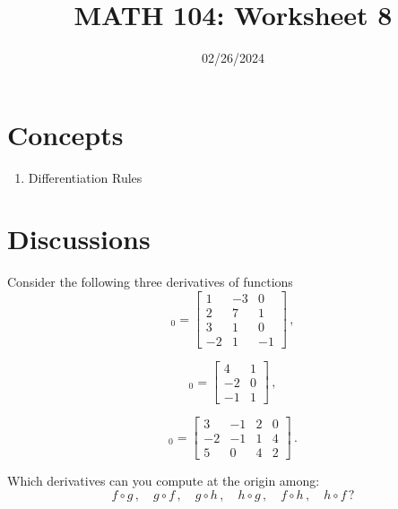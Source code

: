 \documentclass[12pt]{amsart}
\title{ MATH 104: Worksheet 8}
\author{}
\date{02/26/2024}
\begin{document}
\maketitle

\section{Concepts}

\begin{enumerate}
    \item Differentiation Rules 
\end{enumerate}

\section{Discussions}

\begin{question}
    Consider the following three derivatives of functions
    \begin{equation*}
        [Df]_0 = 
        \begin{bmatrix}
            1 & -3 & 0 \\
            2 & 7 & 1 \\
            3 & 1 & 0 \\
            -2 & 1 & -1 
        \end{bmatrix}\,,
    \end{equation*}

    \begin{equation*}
        [Dg]_0 = 
        \begin{bmatrix}
            4 & 1 \\
            -2 & 0 \\
            -1 & 1
        \end{bmatrix} \,,
    \end{equation*}

    \begin{equation*}
        [Dh]_0 =
        \begin{bmatrix}
            3 & -1 & 2 & 0 \\
            -2 & -1 & 1 & 4 \\
            5 & 0 & 4 & 2
        \end{bmatrix} \,.
    \end{equation*}

    Which derivatives can you compute at the origin among:
    \begin{equation*}
        f\circ g \,, \quad g\circ f \,, \quad g \circ h \,, \quad h \circ g \,, \quad f \circ h \,, \quad h \circ f \,?
    \end{equation*}
\end{question}
\end{document}
